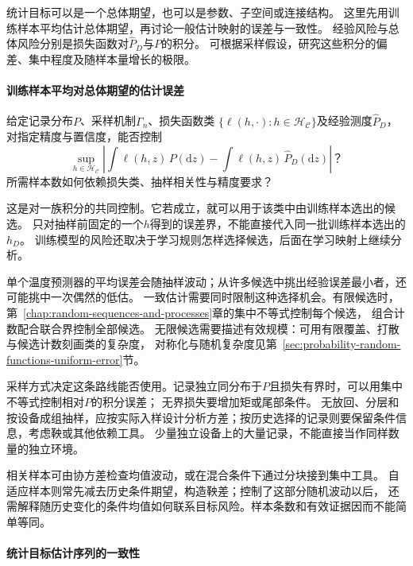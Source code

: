 统计目标可以是一个总体期望，也可以是参数、子空间或连接结构。
这里先用训练样本平均估计总体期望，再讨论一般估计映射的误差与一致性。
经验风险与总体风险分别是损失函数对$\widehat P_D$与$P$的积分。
可根据采样假设，研究这些积分的偏差、集中程度及随样本量增长的极限。

\paragraph{训练样本平均对总体期望的估计误差}

\begin{mathproblem}[有限训练样本对总体泛函的近似]
  \label{question:future-generalization}
  给定记录分布$P$、采样机制$\Gamma_n$、损失函数类
  $\{\ell(h,\cdot):h\in\mathcal H_{\mathcal C}\}$及经验测度$\widehat P_D$，
  对指定精度与置信度，能否控制
  \[
    \sup_{h\in\mathcal H_{\mathcal C}}
      \left|\int\ell(h,z)\,P(\mathrm dz)
      -\int\ell(h,z)\,\widehat P_D(\mathrm dz)\right|\text{？}
  \]
  所需样本数如何依赖损失类、抽样相关性与精度要求？
\end{mathproblem}

这是对一族积分的共同控制。它若成立，就可以用于该类中由训练样本选出的候选。
只对抽样前固定的一个$h$得到的误差界，不能直接代入同一批训练样本选出的$h_D$。
训练模型的风险还取决于学习规则怎样选择候选，后面在学习映射上继续分析。

单个温度预测器的平均误差会随抽样波动；从许多候选中挑出经验误差最小者，还可能挑中一次偶然的低估。
一致估计需要同时限制这种选择机会。有限候选时，第~\ref{chap:random-sequences-and-processes}章的集中不等式控制每个候选，
组合计数配合联合界控制全部候选。
无限候选需要描述有效规模：可用有限覆盖、打散与候选计数刻画类的复杂度，
对称化与随机复杂度见第~\ref{sec:probability-random-functions-uniform-error}节。

采样方式决定这条路线能否使用。记录独立同分布于$P$且损失有界时，可以用集中不等式控制相对$P$的积分误差；
无界损失要增加矩或尾部条件。
无放回、分层和按设备成组抽样，应按实际入样设计分析方差；按历史选择的记录则要保留条件信息，考虑鞅或其他依赖工具。
少量独立设备上的大量记录，不能直接当作同样数量的独立环境。

相关样本可由协方差检查均值波动，或在混合条件下通过分块接到集中工具。
自适应样本则常先减去历史条件期望，构造鞅差；控制了这部分随机波动以后，
还需解释随历史变化的条件均值如何联系目标风险。样本条数和有效证据因而不能简单等同。

\paragraph{统计目标估计序列的一致性}
\label{sec:future-analysis-statistical-recovery}

